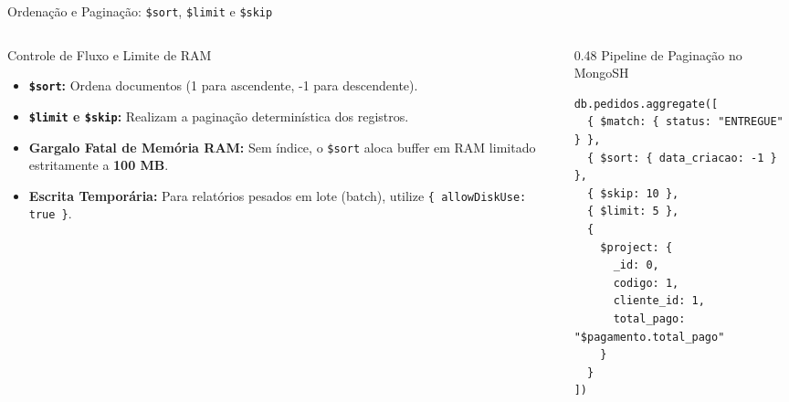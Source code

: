 \begin{frame}[fragile]{Ordenação e Paginação: \texttt{\$sort}, \texttt{\$limit} e \texttt{\$skip}}
  \vspace{0.1cm}
  \begin{columns}[t,onlytextwidth]
    \begin{column}{0.48\textwidth}
      \alert{Controle de Fluxo e Limite de RAM}\par
      \footnotesize
      \begin{itemize}
        \item \textbf{\lstinline[language=mongosh, basicstyle=\footnotesize\ttfamily]|$sort|:} Ordena documentos (1 para ascendente, -1 para descendente).
        \item \textbf{\lstinline[language=mongosh, basicstyle=\footnotesize\ttfamily]|$limit| e \lstinline[language=mongosh, basicstyle=\footnotesize\ttfamily]|$skip|:} Realizam a paginação determinística dos registros.
        \item \textbf{Gargalo Fatal de Memória RAM:} Sem índice, o \lstinline[language=mongosh, basicstyle=\footnotesize\ttfamily]|$sort| aloca buffer em RAM limitado estritamente a \textbf{100 MB}.
        \item \textbf{Escrita Temporária:} Para relatórios pesados em lote (batch), utilize \lstinline[language=mongosh, basicstyle=\footnotesize\ttfamily]|{ allowDiskUse: true }|.
      \end{itemize}
    \end{column}
    \begin{column}{0.48\textwidth}
      \alert{Pipeline de Paginação no MongoSH}\par
      \vspace{0.05cm}
      \begin{lstlisting}[language=mongosh, basicstyle=\scriptsize\ttfamily]
db.pedidos.aggregate([
  { $match: { status: "ENTREGUE" } },
  { $sort: { data_criacao: -1 } },
  { $skip: 10 },
  { $limit: 5 },
  {
    $project: {
      _id: 0,
      codigo: 1,
      cliente_id: 1,
      total_pago: "$pagamento.total_pago"
    }
  }
])
      \end{lstlisting}
    \end{column}
  \end{columns}
\end{frame}
